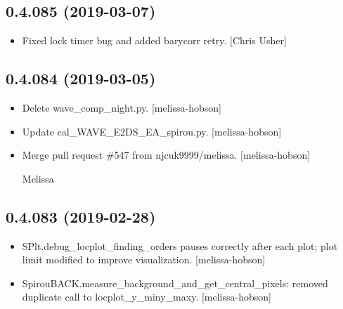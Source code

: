 \documentclass[a4paper,10pt,english]{report}
\begin{document}
\subsection{0.4.085 (2019-03-07)}
\label{\detokenize{misc/changelog:id174}}\begin{itemize}
\item {} 
Fixed lock timer bug and added barycorr retry. {[}Chris Usher{]}

\end{itemize}


\subsection{0.4.084 (2019-03-05)}
\label{\detokenize{misc/changelog:id175}}\begin{itemize}
\item {} 
Delete wave\_comp\_night.py. {[}melissa-hobson{]}

\item {} 
Update cal\_WAVE\_E2DS\_EA\_spirou.py. {[}melissa-hobson{]}

\item {} 
Merge pull request \#547 from njcuk9999/melissa. {[}melissa-hobson{]}

Melissa

\end{itemize}


\subsection{0.4.083 (2019-02-28)}
\label{\detokenize{misc/changelog:id176}}\begin{itemize}
\item {} 
SPlt.debug\_locplot\_finding\_orders pauses correctly after each plot;
plot limit modified to improve visualization. {[}melissa-hobson{]}

\item {} 
SpirouBACK.measure\_background\_and\_get\_central\_pixels: removed
duplicate call to locplot\_y\_miny\_maxy. {[}melissa-hobson{]}

\end{itemize}
\end{document}
